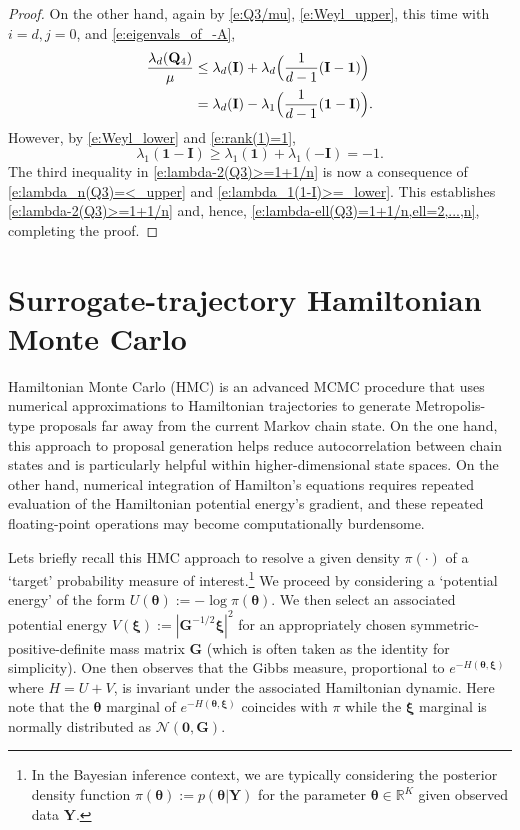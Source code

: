 \documentclass[9pt,twocolumn,twoside]{pnas-new}
\newcommand{\?}{\textbf{?}}
\newcommand{\Y}{\textbf{Y}}
\newcommand{\GD}[1]{#1}
\newcommand{\QQ}{\mathbf{Q}}
\newcommand{\II}{\mathbf{I}}
\newcommand{\Zero}{\boldsymbol{0}}
\newcommand{\ttheta}{\boldsymbol{\theta}}
\newcommand{\mom}{\boldsymbol{\xi}}
\begin{document}
\begin{proof}
On the other hand, again by \eqref{e:Q3/mu}, \eqref{e:Weyl_upper}, this
time with $i = d, j = 0$, and \eqref{e:eigenvals_of_-A},
\begin{align}
  \GD{\frac{\lambda_d(\QQ_4)}{\mu}}
  &\leq \lambda_d(\II)
         + \lambda_d\Big(\frac{1}{d-1}(\II - {\mathbf 1})\Big)
    \notag\\
  &= \lambda_d(\II) - \lambda_1\Big(\frac{1}{d-1}({\mathbf 1}-\II)\Big).
        \label{e:lambda_n(Q3)=<_upper}
\end{align}
However, by \eqref{e:Weyl_lower} and \eqref{e:rank(1)=1},
\begin{equation}\label{e:lambda_1(1-I)>=_lower}
\lambda_1({\mathbf 1}-\II) \geq \lambda_1({\mathbf 1}) + \lambda_1(-\II)= -1.
\end{equation}
The third inequality in \eqref{e:lambda-2(Q3)>=1+1/n} is now a
consequence of \eqref{e:lambda_n(Q3)=<_upper} and
\eqref{e:lambda_1(1-I)>=_lower}. This establishes
\eqref{e:lambda-2(Q3)>=1+1/n} and, hence,
\eqref{e:lambda-ell(Q3)=1+1/n,ell=2,...,n}, completing the proof.
\end{proof}


\section{Surrogate-trajectory Hamiltonian Monte Carlo}
\label{sec:Sur:trad:HMC}

\newcommand{\G}{\mathbf{G}}

Hamiltonian Monte Carlo (HMC) \cite{duane1987hybrid,neal2011mcmc} is
an advanced MCMC procedure that uses numerical approximations to
Hamiltonian trajectories to generate Metropolis-type
\cite{metropolis1953equation} proposals far away from the current
Markov chain state.  On the one hand, this approach to proposal
generation helps reduce autocorrelation between chain states and is
particularly helpful within higher-dimensional state spaces.  On the
other hand, numerical integration of Hamilton's equations requires
repeated evaluation of the Hamiltonian potential energy's gradient,
and these repeated floating-point operations may become
computationally burdensome.

Lets briefly recall this HMC approach to resolve a given density
$\pi(\cdot)$ of a `target' probability measure of
interest.\footnote{In the Bayesian inference context, we are typically
  considering the posterior density function
  $\pi(\ttheta):=p(\ttheta|\Y)$ for the parameter
  $\ttheta\in\mathbb{R}^K$ given observed data $\Y$.}  We proceed by
considering a `potential energy' of the form
$U(\ttheta):=-\log \pi(\ttheta)$.  We then select an associated
potential energy $V(\mom) := | \G^{-1/2} \mom|^2$ for an appropriately
chosen symmetric-positive-definite mass matrix $\G$ (which is often
taken as the identity for simplicity).  One then observes that the
Gibbs measure, proportional to $e^{-H(\ttheta, \mom)}$ where
$H = U +V$, is invariant under the associated Hamiltonian dynamic.
Here note that the $\ttheta$ marginal of $e^{-H(\ttheta, \mom)}$
coincides with $\pi$ while the $\mom$ marginal is normally distributed
as $\mathcal{N}(\Zero,\G)$.
\end{document}
